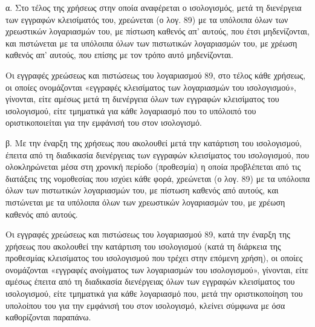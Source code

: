 \documentclass[A4,10pt,greek]{book}
\begin{document}
α. Στο τέλος της χρήσεως στην οποία αναφέρεται ο ισολογισμός, μετά τη διενέργεια των εγγραφών κλεισίματός του, χρεώνεται (ο λογ. 89) με τα υπόλοιπα όλων των χρεωστικών λογαριασμών του, με πίστωση καθενός απ' αυτούς, που έτσι μηδενίζονται, και πιστώνεται με τα υπόλοιπα όλων των πιστωτικών λογαριασμών του, με χρέωση καθενός απ' αυτούς, που επίσης με τον τρόπο αυτό μηδενίζονται.

Οι εγγραφές χρεώσεως και πιστώσεως του λογαριασμού 89, στο τέλος κάθε χρήσεως, οι οποίες ονομάζονται «εγγραφές κλεισίματος των λογαριασμών του ισολογισμού», γίνονται, είτε αμέσως μετά τη διενέργεια όλων των εγγραφών κλεισίματος του ισολογισμού, είτε τμηματικά για κάθε λογαριασμό που το υπόλοιπό του οριστικοποιείται για την εμφάνισή του στον ισολογισμό.

β. Με την έναρξη της χρήσεως που ακολουθεί μετά την κατάρτιση του ισολογισμού, έπειτα από τη διαδικασία διενέργειας των εγγραφών κλεισίματος του ισολογισμού, που ολοκληρώνεται μέσα στη χρονική περίοδο (προθεσμία) η οποία προβλέπεται από τις διατάξεις της νομοθεσίας που ισχύει κάθε φορά, χρεώνεται (ο λογ. 89) με τα υπόλοιπα όλων των πιστωτικών λογαριασμών του, με πίστωση καθενός από αυτούς, και πιστώνεται με τα υπόλοιπα όλων των χρεωστικών λογαριασμών του, με χρέωση καθενός από αυτούς.

Οι εγγραφές χρεώσεως και πιστώσεως του λογαριασμού 89, κατά την έναρξη της χρήσεως που ακολουθεί την κατάρτιση του ισολογισμού (κατά τη διάρκεια της προθεσμίας κλεισίματος του ισολογισμού που τρέχει στην επόμενη χρήση), οι οποίες ονομάζονται «εγγραφές ανοίγματος των λογαριασμών του ισολογισμού», γίνονται, είτε αμέσως έπειτα από τη διαδικασία διενέργειας όλων των εγγραφών κλεισίματος του ισολογισμού, είτε τμηματικά για κάθε λογαριασμό που, μετά την οριστικοποίηση του υπολοίπου του για την εμφάνισή του στον ισολογισμό, κλείνει σύμφωνα με όσα καθορίζονται παραπάνω.
\end{document}
